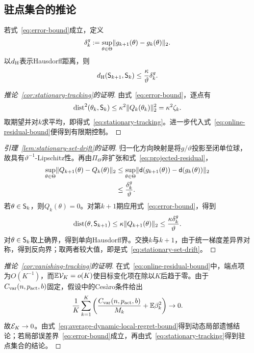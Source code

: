 \subsection{驻点集合的推论}

\begin{lemma}[驻点集合的漂移]\label{lem:stationary-set-drift}
若式~\eqref{eq:error-bound}成立，定义
\begin{equation}\label{eq:gradient-drift}
 \delta_k^g:=\sup_{\theta\in\Theta}
 \lVert g_{k+1}(\theta)-g_k(\theta)\rVert_2.
\end{equation}
以$d_{\mathrm H}$表示Hausdorff距离，则
\begin{equation}\label{eq:stationary-set-drift}
 d_{\mathrm H}(\mathsf S_{k+1},\mathsf S_k)
 \le\frac{\kappa}{\vartheta}\delta_k^g.
\end{equation}
\end{lemma}

\begin{proof}[推论~\ref{cor:stationary-tracking}的证明]
由式~\eqref{eq:error-bound}，逐点有
\[
 \operatorname{dist}^2(\theta_k,\mathsf S_k)
 \le\kappa^2\lVert Q_k(\theta_k)\rVert_2^2
 =\kappa^2\zeta_k.
\]
取期望并对$k$求平均，即得式~\eqref{eq:stationary-tracking}。进一步代入式~\eqref{eq:online-residual-bound}便得到有限期控制。
\end{proof}

\begin{proof}[引理~\ref{lem:stationary-set-drift}的证明]
归一化方向映射是将$g/\vartheta$投影至闭单位球，故具有$\vartheta^{-1}$-Lipschitz性。再由$\Pi_\Theta$非扩张和式~\eqref{eq:projected-residual}，
\begin{align*}
 \sup_{\theta\in\Theta}
 \lVert Q_{k+1}(\theta)-Q_k(\theta)\rVert_2
 &\le
 \sup_{\theta\in\Theta}
 \lVert\mathsf d(g_{k+1}(\theta))-\mathsf d(g_k(\theta))\rVert_2\\
 &\le\frac{\delta_k^g}{\vartheta}.
\end{align*}
若$\theta\in\mathsf S_k$，则$Q_k(\theta)=0$。对第$k+1$期应用式~\eqref{eq:error-bound}，得到
\[
 \operatorname{dist}(\theta,\mathsf S_{k+1})
 \le\kappa\lVert Q_{k+1}(\theta)\rVert_2
 \le\frac{\kappa\delta_k^g}{\vartheta}.
\]
对$\theta\in\mathsf S_k$取上确界，得到单向Hausdorff界。交换$k$与$k+1$，由于统一梯度差异界对称，得到反向界；取两者较大值，即是式~\eqref{eq:stationary-set-drift}。
\end{proof}

\begin{proof}[推论~\ref{cor:vanishing-tracking}的证明]
在式~\eqref{eq:online-residual-bound}中，端点项为$O(K^{-1})$，而$\mathbb E\mathcal V_K=o(K)$使目标变化项在除以$K$后趋于零。由于$C_{\rm var}(n,p_{\rm act},b)$固定，假设中的Ces\`aro条件给出
\[
 \frac1K\sum_{k=1}^{K}\left(\frac{C_{\rm var}(n,p_{\rm act},b)}{M_k}+\mathbb E\beta_k^2\right)\to0.
\]
故$\mathcal E_K\to0$。由式~\eqref{eq:average-dynamic-local-regret-bound}得到动态局部遗憾结论；若局部误差界~\eqref{eq:error-bound}成立，再由式~\eqref{eq:stationary-tracking}得到驻点集合的结论。
\end{proof}

